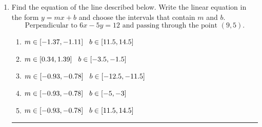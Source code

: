 \documentclass[14pt]{extbook}
\newcommand{\litem}[1]{\item#1\hspace*{-1cm}\rule{\textwidth}{0.4pt}}
\begin{document}
\begin{enumerate}
{\begin{enumerate}[label=\Alph*.]
\end{enumerate} }
\litem{
Find the equation of the line described below. Write the linear equation in the form $ y=mx+b $ and choose the intervals that contain $m$ and $b$.\[ \text{Perpendicular to } 6 x - 5 y = 12 \text{ and passing through the point } (9, 5). \]\begin{enumerate}[label=\Alph*.]
\item \( m \in [-1.37, -1.11] \hspace*{3mm} b \in [11.5, 14.5] \)
\item \( m \in [0.34, 1.39] \hspace*{3mm} b \in [-3.5, -1.5] \)
\item \( m \in [-0.93, -0.78] \hspace*{3mm} b \in [-12.5, -11.5] \)
\item \( m \in [-0.93, -0.78] \hspace*{3mm} b \in [-5, -3] \)
\item \( m \in [-0.93, -0.78] \hspace*{3mm} b \in [11.5, 14.5] \)

\end{enumerate} }
\end{enumerate}
\end{document}
